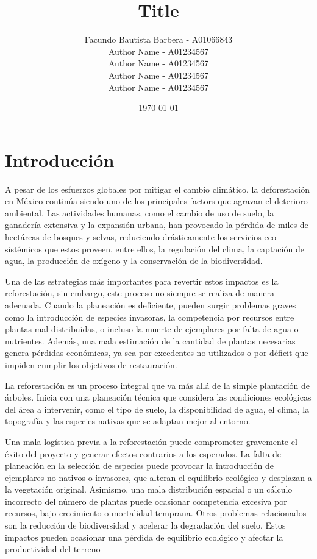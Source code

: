 \documentclass{article}
\title{Title}
\author{
	Facundo Bautista Barbera - A01066843 \\
	Author Name - A01234567 \\
	Author Name - A01234567 \\
	Author Name - A01234567 \\
	Author Name - A01234567
}
\date{\today}
\begin{document}
\maketitle

\section*{Introducción}


A pesar de los esfuerzos globales por mitigar el cambio climático, la deforestación en México continúa siendo uno de los principales factors que agravan el deterioro ambiental.
Las actividades humanas, como el cambio de uso de suelo, la ganadería extensiva y la expansión urbana, han provocado la pérdida de miles de hectáreas de bosques y selvas, reduciendo drásticamente los servicios eco-sistémicos que estos proveen, entre ellos, la regulación del clima, la captación de agua, la producción de oxígeno y la conservación de la biodiversidad.


Una de las estrategias más importantes para revertir estos impactos es la reforestación, sin embargo, este proceso no siempre se realiza de manera adecuada.
Cuando la planeación es deficiente, pueden surgir problemas graves como la introducción de especies invasoras, la competencia por recursos entre plantas mal distribuidas, o incluso la muerte de ejemplares por falta de agua o nutrientes.
Además, una mala estimación de la cantidad de plantas necesarias genera pérdidas económicas, ya sea por excedentes no utilizados o por déficit que impiden cumplir los objetivos de restauración.

La reforestación es un proceso integral que va más allá de la simple plantación de árboles. Inicia con una planeación técnica que considera las condiciones ecológicas del área a intervenir, como el tipo de suelo, la disponibilidad de agua, el clima, la topografía y las especies nativas que se adaptan mejor al entorno.

Una mala logística previa a la reforestación puede comprometer gravemente el éxito del proyecto y generar efectos contrarios a los esperados.
La falta de planeación en la selección de especies puede provocar la introducción de ejemplares no nativos o invasores, que alteran el equilibrio ecológico y desplazan a la vegetación original.
Asimismo, una mala distribución espacial o un cálculo incorrecto del número de plantas puede ocasionar competencia excesiva por recursos, bajo crecimiento o mortalidad temprana.
Otros problemas relacionados son la reducción de biodiversidad y acelerar la degradación del suelo.
Estos impactos pueden ocasionar una pérdida de equilibrio ecológico y afectar la productividad del terreno \citep{fao2015}
\end{document}
